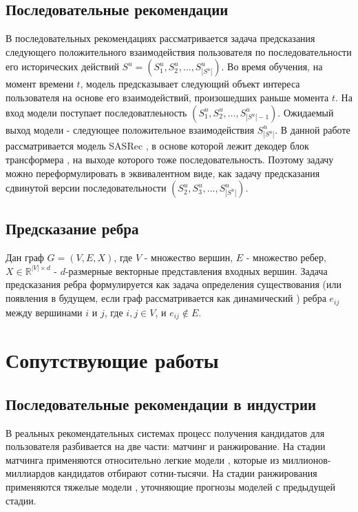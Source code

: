 \documentclass{article}
\begin{document}
\subsection{Последовательные рекомендации}
В последовательных рекомендациях рассматривается задача предсказания следующего положительного взаимодействия 
пользователя по последовательности его исторических действий $S^u = (S_1^u, S_2^u, \dots, S_{|S^u|}^u)$.
Во время обучения, на момент времени $t$, модель предсказывает следующий объект интереса пользователя на основе его
взаимодействий, произошедших раньше момента $t$. На вход модели поступает последоватлеьность
$(S_1^u, S_2^u, \dots, S^u_{|S^u| - 1})$. Ожидаемый выход модели - следующее положительное взаимодействия $S^u_{|S^u|}$. 
В данной работе рассматривается модель SASRec \citep{sasrec}, в основе которой лежит декодер блок трансформера \cite{transformer},
на выходе которого тоже последовательность. 
Поэтому задачу можно переформулировать в эквивалентном виде, как задачу предсказания сдвинутой версии 
последовательности $(S_2^u, S_3^u, \dots, S^u_{|S^u|})$.

\subsection{Предсказание ребра}

Дан граф $G = (V, E, X)$, где $V$ - множество вершин, $E$ - множество ребер, $X \in \mathbb{R}^{|V| \times d}$
- $d$-размерные векторные представления входных вершин. Задача предсказания ребра формулируется как задача
определения существования (или появления в будущем, если граф рассматривается как динамический \cite{dyngnn}) ребра $e_{ij}$
между вершинами $i$ и $j$, где $i, j \in V$, и $e_{ij} \not \in E$.

\section{Сопутствующие работы}

\subsection{Последовательные рекомендации в индустрии}

В реальных рекомендательных системах процесс получения кандидатов для пользователя разбивается на две части: матчинг и ранжирование.
На стадии матчинга применяются относительно легкие модели \cite{xwalk,logQ}, которые из миллионов-миллиардов кандидатов отбирают сотни-тысячи. 
На стадии ранжирования применяются тяжелые модели \cite{dcnv2,masknet,catboost}, уточняющие прогнозы моделей с предыдущей стадии.
\end{document}
